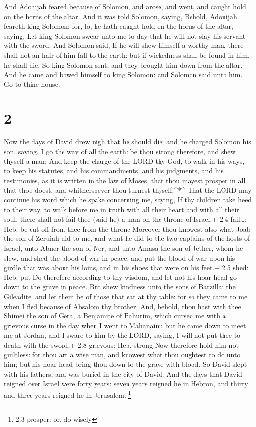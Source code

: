 And Adonijah feared because of Solomon, and arose, and
went, and caught hold on the horns of the altar.  And it
was told Solomon, saying, Behold, Adonijah feareth king Solomon: for,
lo, he hath caught hold on the horns of the altar, saying, Let king
Solomon swear unto me to day that he will not slay his servant with the
sword.  And Solomon said, If he will shew himself a worthy
man, there shall not an hair of him fall to the earth: but if wickedness
shall be found in him, he shall die.  So king Solomon sent,
and they brought him down from the altar. And he came and bowed himself
to king Solomon: and Solomon said unto him, Go to thine house.

\hypertarget{section-1}{%
\section{2}\label{section-1}}

 Now the days of David drew nigh that he should die; and he
charged Solomon his son, saying,  I go the way of all the
earth: be thou strong therefore, and shew thyself a man; 
And keep the charge of the LORD thy God, to walk in his ways, to keep
his statutes, and his commandments, and his judgments, and his
testimonies, as it is written in the law of Moses, that thou mayest
prosper in all that thou doest, and whithersoever thou turnest
thyself:\^{}*\^{}  That the LORD may continue his word which
he spake concerning me, saying, If thy children take heed to their way,
to walk before me in truth with all their heart and with all their soul,
there shall not fail thee (said he) a man on the throne of Israel.+ 2.4
fail\ldots: Heb. be cut off from thee from the throne 
Moreover thou knowest also what Joab the son of Zeruiah did to me, and
what he did to the two captains of the hosts of Israel, unto Abner the
son of Ner, and unto Amasa the son of Jether, whom he slew, and shed the
blood of war in peace, and put the blood of war upon his girdle that was
about his loins, and in his shoes that were on his feet.+ 2.5 shed: Heb.
put  Do therefore according to thy wisdom, and let not his
hoar head go down to the grave in peace.  But shew kindness
unto the sons of Barzillai the Gileadite, and let them be of those that
eat at thy table: for so they came to me when I fled because of Absalom
thy brother.  And, behold, thou hast with thee Shimei the
son of Gera, a Benjamite of Bahurim, which cursed me with a grievous
curse in the day when I went to Mahanaim: but he came down to meet me at
Jordan, and I sware to him by the LORD, saying, I will not put thee to
death with the sword.+ 2.8 grievous: Heb. strong  Now
therefore hold him not guiltless: for thou art a wise man, and knowest
what thou oughtest to do unto him; but his hoar head bring thou down to
the grave with blood.  So David slept with his fathers, and
was buried in the city of David.  And the days that David
reigned over Israel were forty years: seven years reigned he in Hebron,
and thirty and three years reigned he in Jerusalem. \footnote{2.3
  prosper: or, do wisely}

